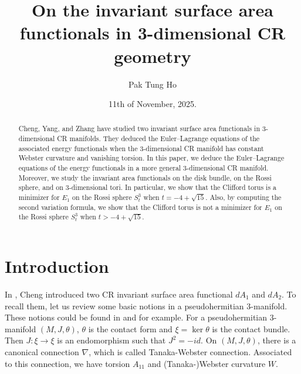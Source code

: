 \documentclass{amsart}
\theoremstyle{Corollary}
\numberwithin{equation}{section}
\begin{document}
\title[Invariant surface area functionals]{On the invariant surface area functionals in 3-dimensional CR geometry}

\author{Pak Tung Ho}
\address{Department of Mathematics, Tamkang University Tamsui, New Taipei City 251301, Taiwan}








\date{11th of November, 2025.}


 

\begin{abstract}
Cheng, Yang, and Zhang have studied 
two  invariant surface area functionals 
in 3-dimensional CR manifolds. 
They 
deduced the Euler–Lagrange equations of the associated energy functionals when the 3-dimensional CR manifold
has constant Webster curvature and vanishing torsion. 
In this paper, 
we deduce the 
Euler–Lagrange equations of the energy functionals
in a more general 
3-dimensional CR manifold. 
Moreover, we study 
the invariant area functionals
on the disk bundle, 
on the Rossi sphere, 
and on  $3$-dimensional tori. 
In particular, we show that the Clifford torus 
is a minimizer for $E_1$ on the Rossi sphere $S^3_t$ when $t=-4+\sqrt{15}$. 
Also, by computing the second variation formula, 
we show that the Clifford torus is not a minimizer 
 for $E_1$ on the Rossi sphere $S^3_t$ when  $t>-4+\sqrt{15}$. 

 
\end{abstract}

\maketitle


\section{Introduction}
 
In \cite{C}, Cheng introduced 
two CR invariant surface area functional 
$dA_1$ and $dA_2$. 
To recall them, let us review some basic notions 
in a pseudohermitian $3$-manifold.
These notions could be found in \cite{Lee}
and \cite{T}
for example. 
For a pseudohermitian $3$-manifold $(M,J,\theta)$, 
$\theta$ is the contact form
and $\xi=\ker\theta$ is the contact bundle. 
Then $J:\xi\to\xi$ is an endomorphism 
such that $J^2=-id$. 
On $(M,J,\theta)$, 
there is a canonical connection $\nabla$, which is called 
Tanaka-Webster connection. 
Associated to this connection, we have 
torsion $A_{11}$ and (Tanaka-)Webster curvature $W$. 
\end{document}
